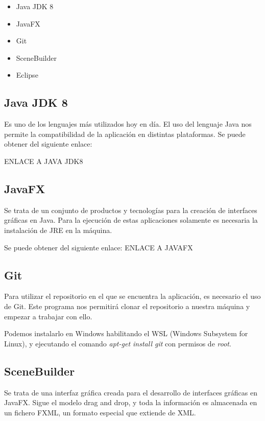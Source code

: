 \begin{itemize}
\item
Java JDK 8
\item
JavaFX
\item
Git
\item
SceneBuilder
\item
Eclipse
\end{itemize}

\subsection{Java JDK 8}

Es uno de los lenguajes más utilizados hoy en día. El uso del lenguaje Java nos permite la compatibilidad de la aplicación en distintas plataformas. Se puede obtener del siguiente enlace:

ENLACE A JAVA JDK8

\subsection{JavaFX}

Se trata de un conjunto de productos y tecnologías para la creación de interfaces gráficas en Java. Para la ejecución de estas aplicaciones solamente es necesaria la instalación de JRE en la máquina.

Se puede obtener del siguiente enlace:
ENLACE A JAVAFX

\subsection{Git}

Para utilizar el repositorio en el que se encuentra la aplicación, es necesario el uso de Git. Este programa nos permitirá clonar el repositorio a nuestra máquina y empezar a trabajar con ello.

Podemos instalarlo en Windows habilitando el WSL (Windows Subsystem for Linux), y ejecutando el comando \emph{apt-get install git} con permisos de \emph{root}.


\subsection{SceneBuilder}

Se trata de una interfaz gráfica creada para el desarrollo de interfaces gráficas en JavaFX. Sigue el modelo drag and drop, y toda la información es almacenada en un fichero FXML, un formato especial que extiende de XML.

